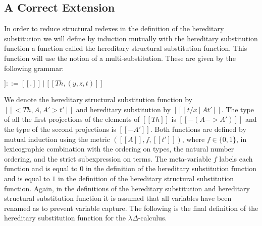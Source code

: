\subsection{A Correct Extension}
\label{subsec:the_final_extension}
In order to reduce structural redexes in the definition of the
hereditary substitution we will define by induction mutually with
the hereditary substitution function  a function called the
hereditary structural substitution function.  This function will
use the notion of a multi-substitution.  These are
given by the following grammar:
\begin{center}
  \begin{math}
    [[Th]] ::= [[.]]\,|\,[[Th,(y,z,t)]]
  \end{math}
\end{center}
We denote the hereditary structural substitution function by $[[<Th ,
A, A'>t']]$ and hereditary substitution by $[[ [t/x] A t']]$.  The
type of all the first projections of the elements of $[[Th]]$ is
$[[{-(A->A')}]]$ and the type of the second projections is $[[{-A'}]]$.
Both functions are defined by mutual induction using the metric
$([[A]],f,[[t']])$, where $f \in \{0,1\}$, in lexicographic
combination with the ordering on types, the natural number ordering,
and the strict subexpression on terms.  The meta-variable $f$ labels
each function and is equal to $0$ in the definition of the hereditary
substitution function and is equal to $1$ in the definition of the
hereditary structural substitution function.  Again, in the definitions of
the hereditary substitution and hereditary structural substitution
function it is assumed that all variables have been renamed as to
prevent variable capture.  The following is the final definition of the
hereditary substitution function for the $\lambda\Delta$-calculus.

